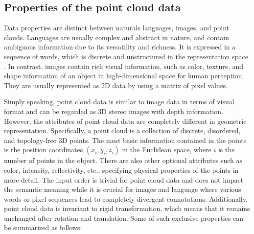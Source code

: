 \documentclass[a4paper,fleqn]{cas-dc}
\begin{document}
\subsection{Properties of the point cloud data} \label{sec:properties}

         


Data properties are distinct between naturals languages, images, and point clouds. Languages are usually complex and abstract in nature, and contain ambiguous information due to its versatility and richness. It is expressed in a sequence of words, which is discrete and unstructured in the representation space \citep{he2020momentum}. In contrast, images contain rich visual information, such as color, texture, and shape information of an object in high-dimensional space \citep{jing2020self} for human perception. They are usually represented as 2D data by using a matrix of pixel values.

Simply speaking, point cloud data is similar to image data in terms of visual format and can be regarded as 3D stereo images with depth information. However, the attributes of point cloud data are completely different in geometric representation. Specifically, a point cloud is a collection of discrete, disordered, and topology-free 3D points. The most basic information contained in the points is the position coordinates $(x_i, y_i, z_i)$ in the Euclidean space, where $i$ is the number of points in the object. There are also other optional attributes such as color, intensity, reflectivity, etc., specifying physical properties of the points in more detail. The input order is trivial for point cloud data and does not impact the semantic meaning while it is crucial for images and language where various words or pixel sequences lead to completely divergent connotations. Additionally, point cloud data is invariant to rigid transformation, which means that it remains unchanged after rotation and translation. Some of such exclusive properties can be summarized as follows:
\end{document}
